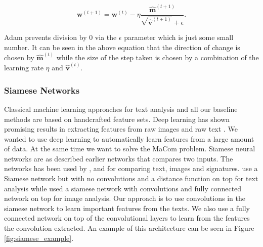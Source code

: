 \begin{description}
        \begin{equation}
            \mathbf{w}^{(t + 1)} = \mathbf{w}^{(t)} -
                \eta\frac
                    {\mathbf{\hat{m}}^{(t+1)}}
                    {\sqrt{\mathbf{\hat{v}}^{(t+1)}} + \epsilon}.
        \end{equation}

        \gls{Adam} prevents division by 0 via the $\epsilon$ parameter which is
        just some small number. It can be seen in the above equation that the
        direction of change is chosen by $\mathbf{\hat{m}}^{(t)}$ while the size
        of the step taken is chosen by a combination of the learning rate $\eta$
        and $\mathbf{\hat{v}}^{(t)}$.

\end{description}


\subsubsection{Siamese Networks}\label{subsubsec:siamese_networks}

Classical machine learning approaches for text analysis and all our baseline
methods are based on handcrafted feature sets. Deep learning has shown
promising results in extracting features from raw images and raw text
\citep{hongxiaosunyuan}. We wanted to use deep learning to automatically learn
features from a large amount of data. At the same time we want to solve the
MaCom problem. Siamese neural networks are as described earlier networks that
compares two inputs. The networks has been used by \citet{Koch2015SiameseNN},
\citet{NIPS1993_769} and \citet{qian:2018} for comparing text, images and
signatures. \citet{qian:2018} use a Siamese network but with no convolutions and
a distance function on top for text analysis while \citet{Koch2015SiameseNN}
used a siamese network with convolutions and fully connected network on top
for image analysis. Our approach is to use convolutions in the siamese network
to learn important features from the texts. We also use a fully connected
network on top of the convolutional layers to learn from the features the
convolution extracted. An example of this architecture can be seen in Figure
\ref{fig:siamese_example}.

